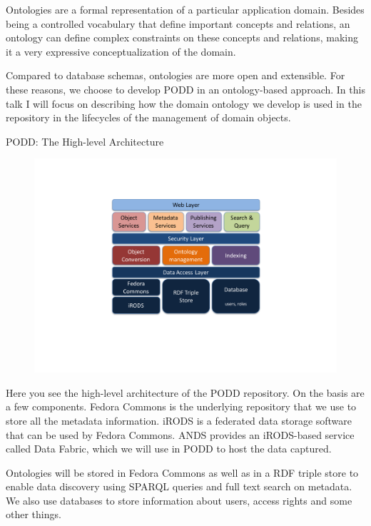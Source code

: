 \documentclass[ignorenonframetext,compress]{beamer}
\begin{document}
Ontologies are a formal representation of a particular application
domain. Besides being a controlled vocabulary that define important
concepts and relations, an ontology can define complex constraints
on these concepts and relations, making it a very expressive
conceptualization of the domain.

Compared to database schemas, ontologies are more open and
extensible. For these reasons, we choose to develop PODD in an
ontology-based approach. In this talk I will focus on describing how
the domain ontology we develop is used in the repository in the
lifecycles of the management of domain objects.

\begin{frame}{PODD: The High-level Architecture}
 \vspace{-6mm}
 \begin{figure}[t]
  \begin{center}
  \includegraphics[trim=48mm 20mm 10mm 35mm, clip, width=130mm]{architecture.pdf}
   \end{center}
  \label{fig}
 \end{figure}
\end{frame}

Here you see the high-level architecture of the PODD repository. On
the basis are a few components. Fedora Commons is the underlying
repository that we use to store all the metadata information. iRODS
is a federated data storage software that can be used by Fedora
Commons. ANDS provides an iRODS-based service called Data Fabric,
which we will use in PODD to host the data captured.

Ontologies will be stored in Fedora Commons as well as in a RDF
triple store to enable data discovery using SPARQL queries and full
text search on metadata. We also use databases to store information
about users, access rights and some other things.
\end{document}
